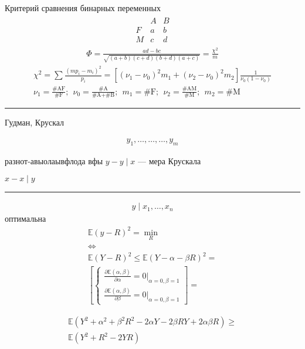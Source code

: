 \documentclass{book}
\begin{document}
Критерий сравнения бинарных переменных
\begin{gather*}
  \begin{matrix}
      &A&B\\
      F&a&b\\
      M&c&d
  \end{matrix}
\end{gather*}
\begin{gather*}
  \Phi = \frac{ad-bc}{\sqrt{(a+b)(c+d)(b+d)(a+c)}}=\frac{\chi^2}{m}
\end{gather*}
\begin{gather*}
    \chi^2=\sum_{}^{} {\frac{(mp_i-m_i)^2}{p_i}}
    =[(\nu_1-\nu_0)^2m_1+(\nu_2-\nu_0)^2m_2]\frac{1}{\nu_0(1-\nu_0)}\\
    \nu_1=\frac{\textrm{\#AF}}{\textrm{\#F}};~~
    \nu_0=\frac{\textrm{\#A}}{\textrm{\#A}+\textrm{\#B}};~~
    m_1=\textrm{\#F};~~
    \nu_2=\frac{\textrm{\#AM}}{\textrm{\#M}};~~
    m_2=\textrm{\#M}
\end{gather*}

\hrule

Гудман, Крускал

\begin{gather*}
  y_1,\dots,\dots,\dots,y_m
\end{gather*}

разнот-авыолаывфлода вфы $y-y\mid x$ --- мера Крускала

$x-x\mid y$

\hrule

\begin{gather*}
  y\mid x_1, \dots, x_n
\end{gather*}
оптимальна
\begin{gather*}
    \mathbb{E}(y-R)^2=\min_R\\
    \Leftrightarrow\\
    \mathbb{E}(Y-R)^2\leq \mathbb{E}(Y-\alpha-\beta R)^2=\\
    \left[\begin{cases}
            \frac{\partial \mathbb{E}(\alpha, \beta)}{\partial \alpha}=0\Big|_{\alpha=0,\beta=1}\\
            \frac{\partial \mathbb{E}(\alpha, \beta)}{\partial \beta}=0\Big|_{\alpha=0,\beta=1}
    \end{cases}\right]=
\end{gather*}

\begin{gather*}
  \mathbb{E}(Y^2+\alpha^2+\beta^2 R^2-2\alpha Y - 2\beta RY+2\alpha\beta R)\geq\\
  \mathbb{E}(Y^2+R^2-2YR)
\end{gather*}
\end{document}
